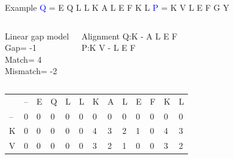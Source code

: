 \documentclass{bredelebeamer}
\begin{document}
\begin{frame}{Example}
 \centering
 \textcolor{blue}{Q} = E Q L L K A L E F K L \quad \textcolor{blue}{P} = K V L E F G Y
\begin{columns}
\begin{block}{Linear gap model} \\
Gap= -1 \\
Match= 4 \\
Mismatch= -2
\end{block}
\begin{block}{Alignment}
Q:\quad K - A L E F \\
P:\quad K V - L E F
\end{block}
\end{columns}
\begin{table}[]
\centering
\begin{tabular}{*{13}{p{0.4cm}}}
                        & --                     & E                      & Q                      & L                      & L                                              & K                                              & A                                              & L                                              & E                                               & F                                               & K                       & L                       \\ \cline{2-13} 
\multicolumn{1}{l|}{--} & \multicolumn{1}{l|}{0} & \multicolumn{1}{l|}{0} & \multicolumn{1}{l|}{0} & \multicolumn{1}{l|}{0} & \multicolumn{1}{l|}{\cellcolor[HTML]{3166FF}0} & \multicolumn{1}{l|}{0}                         & \multicolumn{1}{l|}{0}                         & \multicolumn{1}{l|}{0}                         & \multicolumn{1}{l|}{0}                          & \multicolumn{1}{l|}{0}                          & \multicolumn{1}{l|}{0}  & \multicolumn{1}{l|}{0}  \\ \cline{2-13} 
\multicolumn{1}{l|}{K}  & \multicolumn{1}{l|}{0} & \multicolumn{1}{l|}{0} & \multicolumn{1}{l|}{0} & \multicolumn{1}{l|}{0} & \multicolumn{1}{l|}{0}                         & \multicolumn{1}{l|}{\cellcolor[HTML]{3166FF}4} & \multicolumn{1}{l|}{3} & \multicolumn{1}{l|}{2}                         & \multicolumn{1}{l|}{1}                          & \multicolumn{1}{l|}{0}                          & \multicolumn{1}{l|}{4}  & \multicolumn{1}{l|}{3}  \\ \cline{2-13} 
\multicolumn{1}{l|}{V}  & \multicolumn{1}{l|}{0} & \multicolumn{1}{l|}{0} & \multicolumn{1}{l|}{0} & \multicolumn{1}{l|}{0} & \multicolumn{1}{l|}{0}                         & \multicolumn{1}{l|}{\cellcolor[HTML]{3166FF}3}                         & \multicolumn{1}{l|}{\cellcolor[HTML]{3166FF}2} & \multicolumn{1}{l|}{1}                         & \multicolumn{1}{l|}{0}                          & \multicolumn{1}{l|}{0}                          & \multicolumn{1}{l|}{3}  & \multicolumn{1}{l|}{2}  \\ \cline{2-13}  %

\end{tabular}
\end{table}
\end{frame}
\end{document}
